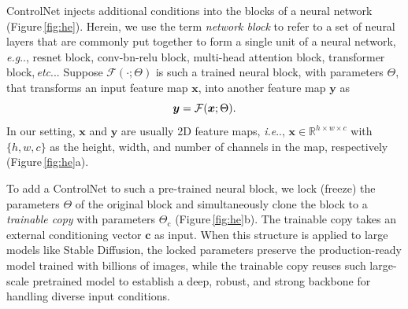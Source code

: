 \documentclass[10pt,twocolumn,letterpaper]{article}
\makeatletter
\DeclareRobustCommand\onedot{\futurelet\@let@token\@onedot}
\def\@onedot{\ifx\@let@token.\else.\null\fi\xspace}
\def\eg{\emph{e.g}\onedot}
\def\ie{\emph{i.e}\onedot}
\def\etc{\emph{etc}\onedot}
\makeatother
\begin{document}
	ControlNet injects additional conditions into the blocks of a neural
	network (Figure\,\ref{fig:he}). Herein, we use the term {\em
		network block} to refer to a set of neural layers that are commonly
	put together to form a single unit of a neural network, \eg, resnet block,
	conv-bn-relu block, multi-head attention block, transformer
	block,\,\etc.
	Suppose $\mathcal{F}(\cdot;\Theta)$ is such a trained neural block, with
	parameters $\Theta$, that transforms an input feature map $\bm{x}$,
	into another feature map $\bm{y}$ as
	\vspace{-3pt}\begin{equation}\vspace{-3pt}
		\bm{y}=\mathcal{F}(\bm{x};\Theta) .
	\end{equation}
	In our setting, $\bm{x}$ and $\bm{y}$ are usually 2D feature maps, \ie, $\bm{x}\in\mathbb{R}^{h\times w \times c}$ with $\{h, w, c\}$
	as the height, width, and number of channels in the map,
	respectively (Figure\,\ref{fig:he}a). 
	
	To add a ControlNet to such a pre-trained neural block, we lock (freeze)
	the parameters $\Theta$ of the original block and simultaneously clone
	the block to a {\em trainable copy} with parameters $\Theta_\text{c}$
	(Figure\,\ref{fig:he}b).  The trainable copy takes an external
	conditioning vector $\bm{c}$ as input. When this structure is applied
	to large models like Stable Diffusion, the locked parameters preserve
	the production-ready model trained with billions of images, while the
	trainable copy reuses such large-scale pretrained model to establish a
	deep, robust, and strong backbone for handling diverse input
	conditions.
	
\end{document}
